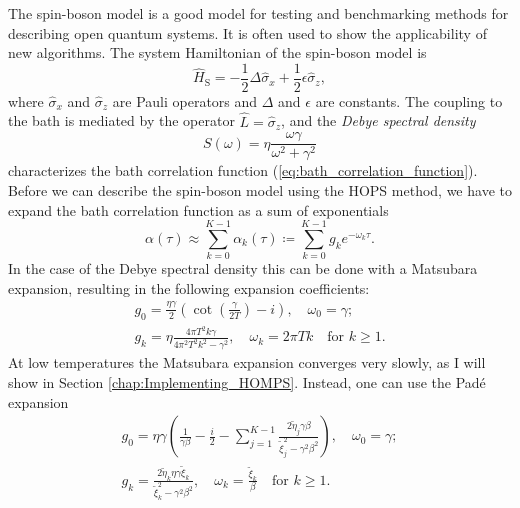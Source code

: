 The spin-boson model is a good model for testing and benchmarking methods for describing open quantum systems. It is often used
to show the applicability of new algorithms. The system Hamiltonian of the spin-boson model is
\begin{equation}
    \label{eq:system_hamiltonian_SBM}
    \hat{H}_\text{S} = -\frac{1}{2}\Delta\hat{\sigma}_x + \frac{1}{2}\epsilon\hat{\sigma}_z,
\end{equation}
where $\hat{\sigma}_x$ and $\hat{\sigma}_z$ are Pauli operators and $\Delta$ and $\epsilon$ are constants.
The coupling to the bath is mediated by the operator $\hat{L} = \hat{\sigma}_z$, and the \textit{Debye spectral density}
\begin{equation}
    \label{eq:debye_spectral_density}
    S(\omega) =\eta\frac{\omega\gamma}{\omega^2+\gamma^2}
\end{equation}
characterizes the bath correlation function (\ref{eq:bath_correlation_function}). Before we can describe the spin-boson
model using the HOPS method, we have to expand the bath correlation function as a sum of exponentials
\begin{equation*}
    \alpha\left(\tau\right) \approx \sum_{k=0}^{K-1} \alpha_k\left(\tau\right) \coloneqq \sum_{k=0}^{K-1} g_k e^{-\omega_k\tau}.
\end{equation*}
In the case of the Debye spectral density this can be done with a Matsubara expansion, resulting in the following expansion coefficients:
\begin{equation}
    \label{eq:expansion_coefficients_debye_BCF_SBM_Matsubara}
    \begin{split}
        g_0 = \frac{\eta\gamma}{2}\left(
            \cot\left(\frac{\gamma}{2T}\right) - i
        \right),\quad
        \omega_0 = \gamma;\\
        g_k = \eta \frac{4\pi T^2k\gamma}{4\pi^2T^2k^2-\gamma^2},\quad
        \omega_k = 2\pi Tk \quad \text{for }k\ge1.
    \end{split}
\end{equation}
At low temperatures the Matsubara expansion converges very slowly, as I will show in Section \ref{chap:Implementing_HOMPS}.
Instead, one can use the Padé expansion
\begin{equation}
    \label{eq:expansion_coefficients_debye_BCF_SBM_Pade}
    \begin{split}
        g_0 = \eta\gamma\left(
            \frac{1}{\gamma\beta}-\frac{i}{2}-\sum_{j=1}^{K-1}\frac{2\tilde{\eta}_j\gamma\beta}{\tilde{\xi}_j^2-\gamma^2\beta^2}
        \right),\quad
        \omega_0 = \gamma;\\
        g_k = \frac{2\tilde{\eta}_k\eta\gamma\tilde{\xi}_k}{\tilde{\xi}_k^2-\gamma^2\beta^2},\quad
        \omega_k = \frac{\tilde{\xi}_k}{\beta} \quad \text{for }k\ge1.
    \end{split}
\end{equation}
